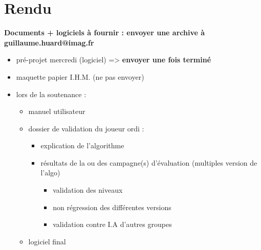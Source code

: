 \documentclass{article}
\begin{document}
\section{Rendu}
\textbf{Documents + logiciels à fournir : envoyer une archive à guillaume.huard@imag.fr}
\begin{itemize}
\item pré-projet mercredi (logiciel) => \textbf{envoyer une fois terminé}
\item maquette papier I.H.M. (ne pas envoyer)
\item lors de la soutenance :
  \begin{itemize}
  \item manuel utilisateur
  \item dossier de validation du joueur ordi :
    \begin{itemize}
    \item explication de l'algorithme
    \item résultats de la ou des campagne(s) d'évaluation  (multiples version de l'algo)
      \begin{itemize}
      \item validation des niveaux 
      \item non régression des différentes versions
      \item validation contre I.A d'autres groupes
      \end{itemize}
    \end{itemize}
  \item logiciel final
  \end{itemize}
\end{itemize}
\newpage
\end{document}
